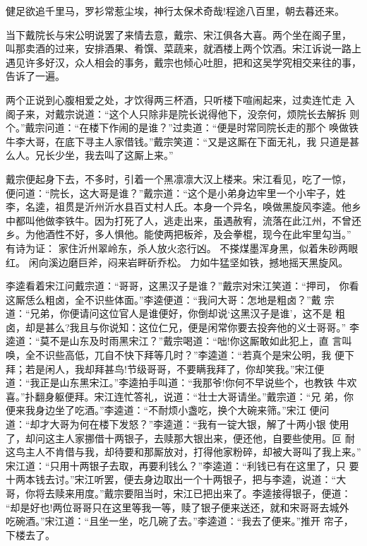 健足欲追千里马，罗衫常惹尘埃，神行太保术奇哉!程途八百里，朝去暮还来。

当下戴院长与宋公明说罢了来情去意，戴宗、宋江俱各大喜。两个坐在阁子里，
叫那卖酒的过来，安排酒果、肴馔、菜蔬来，就酒楼上两个饮酒。宋江诉说一路上
遇见许多好汉，众人相会的事务，戴宗也倾心吐胆，把和这吴学究相交来往的事，
告诉了一遍。

两个正说到心腹相爱之处，才饮得两三杯酒，只听楼下喧闹起来，过卖连忙走
入阁子来，对戴宗说道：“这个人只除非是院长说得他下，没奈何，烦院长去解拆
则个。”戴宗问道：“在楼下作闹的是谁？”过卖道：“便是时常同院长走的那个
唤做铁牛李大哥，在底下寻主人家借钱。”戴宗笑道：“又是这厮在下面无礼，我
只道是甚么人。兄长少坐，我去叫了这厮上来。”

戴宗便起身下去，不多时，引着一个黑凛凛大汉上楼来。宋江看见，吃了一惊，
便问道：“院长，这大哥是谁？”戴宗道：“这个是小弟身边牢里一个小牢子，姓
李，名逵，祖贯是沂州沂水县百丈村人氏。本身一个异名，唤做黑旋风李逵。他乡
中都叫他做李铁牛。因为打死了人，逃走出来，虽遇赦宥，流落在此江州，不曾还
乡。为他酒性不好，多人惧他。能使两把板斧，及会拳棍，现今在此牢里勾当。”
有诗为证：
家住沂州翠岭东，杀人放火恣行凶。
不搽煤墨浑身黑，似着朱砂两眼红。
闲向溪边磨巨斧，闷来岩畔斫乔松。
力如牛猛坚如铁，撼地摇天黑旋风。

李逵看着宋江问戴宗道：“哥哥，这黑汉子是谁？”戴宗对宋江笑道：“押司，
你看这厮恁么粗卤，全不识些体面。”李逵便道：“我问大哥：怎地是粗卤？”戴
宗道：“兄弟，你便请问这位官人是谁便好，你倒却说‘这黑汉子是谁’，这不是
粗卤，却是甚么?我且与你说知：这位仁兄，便是闲常你要去投奔他的义士哥哥。”
李逵道：“莫不是山东及时雨黑宋江？”戴宗喝道：“咄!你这厮敢如此犯上，直
言叫唤，全不识些高低，兀自不快下拜等几时？”李逵道：“若真个是宋公明，我
便下拜；若是闲人，我却拜甚鸟!节级哥哥，不要瞒我拜了，你却笑我。”宋江便
道：“我正是山东黑宋江。”李逵拍手叫道：“我那爷!你何不早说些个，也教铁
牛欢喜。”扑翻身躯便拜。宋江连忙答礼，说道：“壮士大哥请坐。”戴宗道：“兄
弟，你便来我身边坐了吃酒。”李逵道：“不耐烦小盏吃，换个大碗来筛。”宋江
便问道：“却才大哥为何在楼下发怒？”李逵道：“我有一锭大银，解了十两小银
使用了，却问这主人家挪借十两银子，去赎那大银出来，便还他，自要些使用。叵
耐这鸟主人不肯借与我，却待要和那厮放对，打得他家粉碎，却被大哥叫了我上来。”
宋江道：“只用十两银子去取，再要利钱么？”李逵道：“利钱已有在这里了，只
要十两本钱去讨。”宋江听罢，便去身边取出一个十两银子，把与李逵，说道：“大
哥，你将去赎来用度。”戴宗要阻当时，宋江已把出来了。李逵接得银子，便道：
“却是好也!两位哥哥只在这里等我一等，赎了银子便来送还，就和宋哥哥去城外
吃碗酒。”宋江道：“且坐一坐，吃几碗了去。”李逵道：“我去了便来。”推开
帘子，下楼去了。

